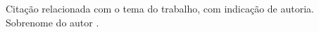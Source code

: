 


\vspace*{10cm}

\begin{epigrafe}	
		Citação relacionada com o tema do trabalho, com indicação de autoria. Sobrenome do autor \cite[p. 4]{manualufpe2020}.
\end{epigrafe}
	




